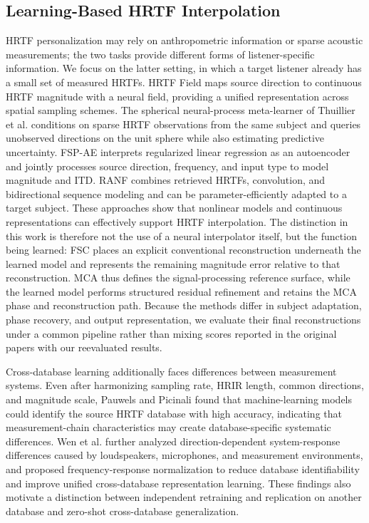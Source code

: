 \documentclass[UTF8,a4paper]{article}
\begin{document}
\subsection{Learning-Based HRTF Interpolation}

HRTF personalization may rely on anthropometric information or sparse acoustic measurements; the two tasks provide different forms of listener-specific information\cite{R15,R16}. We focus on the latter setting, in which a target listener already has a small set of measured HRTFs. HRTF Field maps source direction to continuous HRTF magnitude with a neural field, providing a unified representation across spatial sampling schemes\cite{R22}. The spherical neural-process meta-learner of Thuillier et al. conditions on sparse HRTF observations from the same subject and queries unobserved directions on the unit sphere while also estimating predictive uncertainty\cite{R26}. FSP-AE interprets regularized linear regression as an autoencoder and jointly processes source direction, frequency, and input type to model magnitude and ITD\cite{R4}. RANF combines retrieved HRTFs, convolution, and bidirectional sequence modeling and can be parameter-efficiently adapted to a target subject\cite{R5}. These approaches show that nonlinear models and continuous representations can effectively support HRTF interpolation. The distinction in this work is therefore not the use of a neural interpolator itself, but the function being learned: FSC places an explicit conventional reconstruction underneath the learned model and represents the remaining magnitude error relative to that reconstruction. MCA thus defines the signal-processing reference surface, while the learned model performs structured residual refinement and retains the MCA phase and reconstruction path. Because the methods differ in subject adaptation, phase recovery, and output representation, we evaluate their final reconstructions under a common pipeline rather than mixing scores reported in the original papers with our reevaluated results.

Cross-database learning additionally faces differences between measurement systems. Even after harmonizing sampling rate, HRIR length, common directions, and magnitude scale, Pauwels and Picinali found that machine-learning models could identify the source HRTF database with high accuracy, indicating that measurement-chain characteristics may create database-specific systematic differences\cite{R24}. Wen et al. further analyzed direction-dependent system-response differences caused by loudspeakers, microphones, and measurement environments, and proposed frequency-response normalization to reduce database identifiability and improve unified cross-database representation learning\cite{R25}. These findings also motivate a distinction between independent retraining and replication on another database and zero-shot cross-database generalization.
\end{document}
